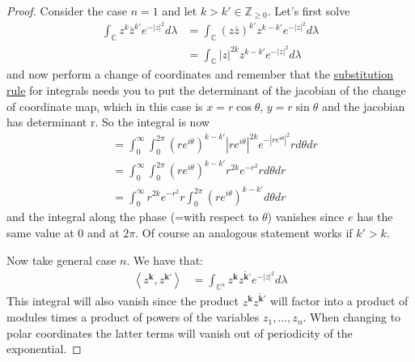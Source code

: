 \begin{proof}\leavevmode
Consider the case $n=1$ and let $k>k'\in\mathbb{Z}_{\geq 0}$. Let's first solve
 \begin{align*}
	 \int_{\mathbb{C}}z^k\bar{z}^{k'}e^{-|z|^2}d\lambda&=\int_{\mathbb{C}}(z\bar{z})^{k'}z^{k-k'}e^{-|z|^2} d\lambda\\
&=\int_{\mathbb{C}}|z|^{2k}z^{k-k'}e^{-|z|^2}d\lambda
\end{align*}
and now perform a change of coordinates and remember that the \href{https://en.wikipedia.org/wiki/Polar_coordinate_system#Generalization}{substitution rule} for integrals needs you to put the determinant of the jacobian of the change of coordinate map, which in this case is $x=r\cos \theta$, $y=r\sin \theta$ and the jacobian has determinant r. So the integral is now
\begin{align*}
&=\int_{0}^\infty \int_{0}^{2\pi}(re^{i\theta})^{k-k'}|re^{i\theta}|^{2k}e^{-|re^{i\theta}|^2}rd\theta dr\\
& =\int_{0}^\infty\int_{0}^{2\pi}(re^{i\theta})^{k-k'}r^{2k}e^{-r^2}rd\theta dr\\
& =\int_{0}^\infty r^{2k}e^{-r^2}r\int_{0}^{2\pi}(re^{i\theta})^{k-k'}d\theta dr
\end{align*}
and the integral along the phase (=with respect to $\theta$) vanishes since $e$ has the same value at  $0$ and at $2\pi$. Of course an analogous statement works if $k'>k$.

Now take general case $n$. We have that:
 \begin{align*}
	\left<z^{\mathbf{k}},z^{\mathbf{k}'}\right>&= \int_{\mathbb{C}^n}z^{\mathbf{k}}\overline{z^{\mathbf{k}'}}e^{-|z|^2}d\lambda%
\end{align*}
This integral will also vanish since the product $z^{\mathbf{k}}\overline{z^{\mathbf{k}'}}$ will factor into a product of modules times a product of powers of the variables  $z_1,\ldots,z_n$. When changing to polar coordinates the latter terms will vanish out of periodicity of the exponential.


\end{proof}
